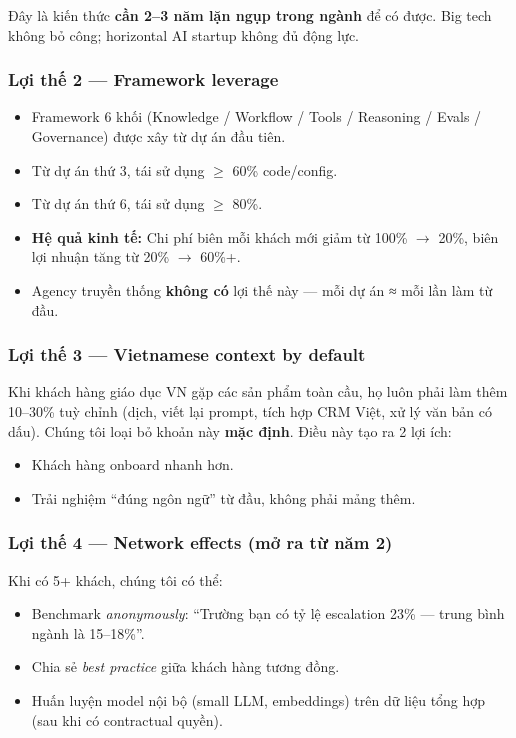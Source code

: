 \documentclass[11pt,a4paper]{article}
\begin{document}
Đây là kiến thức \textbf{cần 2--3 năm lặn ngụp trong ngành} để có được. Big tech
không bỏ công; horizontal AI startup không đủ động lực.

\subsubsection*{Lợi thế 2 --- Framework leverage}

\begin{itemize}
\item Framework 6 khối (Knowledge / Workflow / Tools / Reasoning / Evals / Governance) được xây từ dự án đầu tiên.
\item Từ dự án thứ 3, tái sử dụng $\geq$ 60\% code/config.
\item Từ dự án thứ 6, tái sử dụng $\geq$ 80\%.
\item \textbf{Hệ quả kinh tế:} Chi phí biên mỗi khách mới giảm từ 100\% $\to$ 20\%, biên lợi nhuận tăng từ 20\% $\to$ 60\%+.
\item Agency truyền thống \textbf{không có} lợi thế này --- mỗi dự án ≈ mỗi lần làm từ đầu.
\end{itemize}

\subsubsection*{Lợi thế 3 --- Vietnamese context by default}

Khi khách hàng giáo dục VN gặp các sản phẩm toàn cầu, họ luôn phải làm thêm
10--30\% tuỳ chỉnh (dịch, viết lại prompt, tích hợp CRM Việt, xử lý văn bản có
dấu). Chúng tôi loại bỏ khoản này \textbf{mặc định}. Điều này tạo ra 2 lợi ích:

\begin{itemize}
\item Khách hàng onboard nhanh hơn.
\item Trải nghiệm ``đúng ngôn ngữ'' từ đầu, không phải mảng thêm.
\end{itemize}

\subsubsection*{Lợi thế 4 --- Network effects (mở ra từ năm 2)}

Khi có 5+ khách, chúng tôi có thể:
\begin{itemize}
\item Benchmark \textit{anonymously}: ``Trường bạn có tỷ lệ escalation 23\% --- trung bình ngành là 15--18\%''.
\item Chia sẻ \textit{best practice} giữa khách hàng tương đồng.
\item Huấn luyện model nội bộ (small LLM, embeddings) trên dữ liệu tổng hợp (sau khi có contractual quyền).
\end{itemize}
\end{document}
